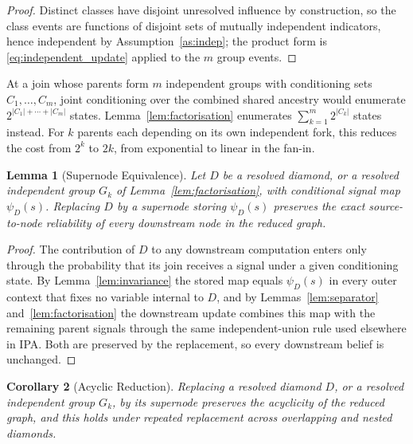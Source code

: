 \documentclass[preprint,12pt]{elsarticle}
\newtheorem{lemma}{Lemma}[section]
\newtheorem{corollary}[lemma]{Corollary}
\begin{document}
\begin{proof}
Distinct classes have disjoint unresolved influence by construction, so the class events are functions of disjoint sets of mutually independent indicators, hence independent by Assumption~\ref{as:indep}; the product form is \eqref{eq:independent_update} applied to the $m$ group events.
\end{proof}

At a join whose parents form $m$ independent groups with conditioning sets $C_1,\ldots,C_m$, joint conditioning over the combined shared ancestry would enumerate $2^{|C_1|+\cdots+|C_m|}$ states. Lemma~\ref{lem:factorisation} enumerates $\sum_{k=1}^m 2^{|C_k|}$ states instead. For $k$ parents each depending on its own independent fork, this reduces the cost from $2^k$ to $2k$, from exponential to linear in the fan-in.

\begin{lemma}[Supernode Equivalence]\label{lem:supernode}
Let $D$ be a resolved diamond, or a resolved independent group $G_k$ of Lemma~\ref{lem:factorisation}, with conditional signal map $\psi_D(s)$. Replacing $D$ by a supernode storing $\psi_D(s)$ preserves the exact source-to-node reliability of every downstream node in the reduced graph.
\end{lemma}

\begin{proof}
The contribution of $D$ to any downstream computation enters only through the probability that its join receives a signal under a given conditioning state. By Lemma~\ref{lem:invariance} the stored map equals $\psi_D(s)$ in every outer context that fixes no variable internal to $D$, and by Lemmas~\ref{lem:separator} and~\ref{lem:factorisation} the downstream update combines this map with the remaining parent signals through the same independent-union rule used elsewhere in IPA. Both are preserved by the replacement, so every downstream belief is unchanged.
\end{proof}

\begin{corollary}[Acyclic Reduction]\label{cor:acyclic}
Replacing a resolved diamond $D$, or a resolved independent group $G_k$, by its supernode preserves the acyclicity of the reduced graph, and this holds under repeated replacement across overlapping and nested diamonds.
\end{corollary}
\end{document}
